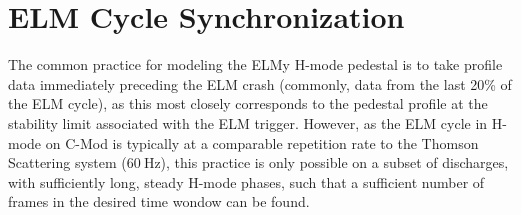 \section{ELM Cycle Synchronization}\label{sec:elmy_sync}

The common practice for modeling the ELMy H-mode pedestal is to take profile data immediately preceding the ELM crash (commonly, data from the last 20\% of the ELM cycle), as this most closely corresponds to the pedestal profile at the stability limit associated with the ELM trigger.  However, as the ELM cycle in H-mode on C-Mod is typically at a comparable repetition rate to the Thomson Scattering system ($\SI{60}{\hertz}$), this practice is only possible on a subset of discharges, with sufficiently long, steady H-mode phases, such that a sufficient number of frames in the desired time wondow can be found.

\begin{figure}[h]
 \pushtooutside
\end{figure}

